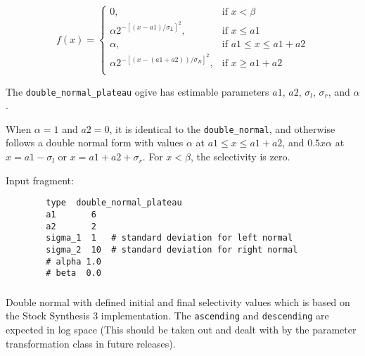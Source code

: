 \subsubsection[Double-normal-plateau]{}\label{sec:Selectivity-DoubleNormalPlateau}

\begin{equation}
f(x) = \begin{cases}
0, & \text{if $x < \beta$} \\
\alpha 2^{-[(x- a1)/\sigma_L ]^2}, & \text{if $x \leq a1$} \\
\alpha, 							& \text{if $a1 \le x \leq a1 + a2 $}\\
\alpha 2^{-[(x- (a1 + a2))/\sigma_R ]^2}, & \text{if $x \ge a1 + a2 $}\\
\end{cases}
\end{equation}

The \texttt{double\_normal\_plateau} ogive has estimable parameters \(a1\), \(a2\), \(\sigma_l\), \(\sigma_r\), and \(\alpha\). 

When \(\alpha = 1\) and \(a2 = 0\), it is identical to the \texttt{double\_normal}, and otherwise follows a double normal form with values \(\alpha\) at \(a1 \le x \leq a1+a2\), and \(0.5 x \alpha\) at \(x= a1-\sigma_l\) or \(x=a1+a2+\sigma_r\). For $x < \beta$, the selectivity is zero.

Input fragment: {\small{\begin{verbatim}
		type  double_normal_plateau
		a1       6    
		a2 	     2
		sigma_1  1   # standard deviation for left normal
		sigma_2  10  # standard deviation for right normal
		# alpha 1.0
		# beta  0.0
		\end{verbatim}}}

\subsubsection[Double-normal-stocksynthesis]{}\label{sec:Selectivity-DoubleNormalStockSynthesis}

Double normal with defined initial and final selectivity values which is based on the Stock Synthesis 3 implementation. The \texttt{ascending} and \texttt{descending} are expected in log space (This should be taken out and dealt with by the parameter transformation class in future releases).

